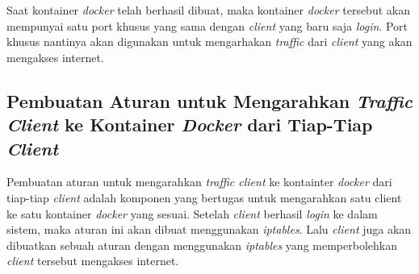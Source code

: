 	Saat kontainer \textit{docker} telah berhasil dibuat, maka kontainer \textit{docker} tersebut akan mempunyai satu port khusus yang sama dengan \textit{client} yang baru saja \textit{login}. Port khusus nantinya akan digunakan untuk mengarhakan \textit{traffic} dari \textit{client} yang akan mengakses internet.

   	\subsection{Pembuatan Aturan untuk Mengarahkan \textit{Traffic Client} ke Kontainer \textit{Docker} dari Tiap-Tiap \textit{Client}}
   	Pembuatan aturan untuk mengarahkan \textit{traffic client} ke kontainter \textit{docker} dari tiap-tiap \textit{client} adalah komponen yang bertugas untuk mengarahkan satu client ke satu kontainer \textit{docker} yang sesuai. Setelah \textit{client} berhasil \textit{login} ke dalam sistem, maka aturan ini akan dibuat menggunakan \textit{iptables}. Lalu \textit{client} juga akan dibuatkan sebuah aturan dengan menggunakan \textit{iptables} yang memperbolehkan \textit{client} tersebut mengakses internet.